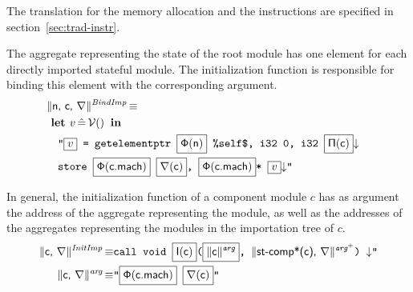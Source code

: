\documentclass{llncs}
\newcommand{\trad}[2]{\ensuremath{\lVert \textsf{#1} \rVert^{\textit{#2}}}}
\newcommand{\nl}[0]{\ensuremath{\downarrow}}
\DeclareMathOperator{\isdef}{\equiv}
\DeclareMathOperator{\variable}{\mathcal{V}()}
\newcommand{\llvm}[1]{\texttt{#1}}
\newcommand{\B}[1]{\textsf{#1}}
\newcommand{\ListOf}[1]{$\mbox{#1}^+$}
\newcommand{\LET}[0]{\textbf{ let }}
\DeclareMathOperator{\BE}{\hat{=}}
\newcommand{\IN}[0]{\textbf{ in }}
\newcommand{\PH}[1]{\framebox{$#1$}}
\newcommand{\idx}[0]{\ensuremath{\sf\Pi}}
\newcommand{\stateref}[0]{\ensuremath{\sf\Phi}}
\newcommand{\self}[0]{\llvm{\%self\$}}
\newcommand{\init}[0]{\ensuremath{\mathsf{I}}}
\begin{document}
The translation for the memory allocation and the instructions are specified in
section~\ref{sec:trad-instr}.  

The aggregate representing the state of the root module has one element for
each directly imported stateful module. The initialization function is
responsible for binding this element with the corresponding argument.
\begin{align*}
  \lefteqn{\trad{\B{n}, \B{c}, \argname}{BindImp} \isdef} \\
  & \LET v \BE \variable \IN \\
  & \quad \llvm{"\PH{v} = getelementptr \PH{\stateref(\B{n})} \self, i32 0, i32 \PH{\idx(\B{c})}\nl}\\
  & \quad \llvm{store \PH{\stateref(\B{c.mach})} \PH{\argname(\B{c})}, 
    \PH{\stateref(\B{c.mach})}* \PH{v}\nl"}
\end{align*}


In general, the initialization function of a component module $c$ has as
argument the address of the aggregate representing the module, as well as the
addresses of the aggregates representing the modules in the importation tree of
$c$.
\begin{align*}
  \trad{\B{c}, \argname}{InitImp} \isdef&
  \llvm{call void \PH{\init(\B{c})}(\PH{\trad{c}{arg}}, \trad{\components(\B{c}), \argname}{\ListOf{arg}}) \nl"} \\
\trad{\B{c}, \argname}{arg} \isdef& 
  \llvm{"\PH{\stateref(\B{c.mach})} \PH{\argname(\B{c})}"}
\end{align*}



\end{document}
